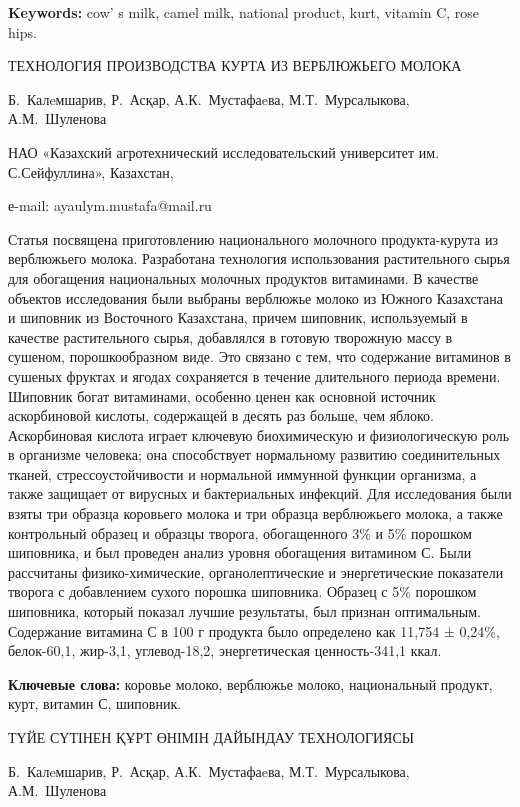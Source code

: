 {\bfseries Keywords:} cow' s milk, camel milk, national
product, kurt, vitamin C, rose hips.

\begin{header}
ТЕХНОЛОГИЯ ПРОИЗВОДСТВА КУРТА ИЗ ВЕРБЛЮЖЬЕГО МОЛОКА

Б.~Калeмшарив,
Р.~Асқар,
А.К.~Мустафаeва\envelope,
М.Т.~Мурсалыкова,
А.М.~Шуленова
\end{header}

\begin{affil}
НАО «Казахский агротехнический исследовательский университет им. С.Сейфуллина», Казахстан,

е-mail: ayaulym.mustafa@mail.ru
\end{affil}

Статья посвящена приготовлению национального молочного продукта-курута
из верблюжьего молока. Разработана технология использования
растительного сырья для обогащения национальных молочных продуктов
витаминами. В качестве объектов исследования были выбраны верблюжье
молоко из Южного Казахстана и шиповник из Восточного Казахстана, причем
шиповник, используемый в качестве растительного сырья, добавлялся в
готовую творожную массу в сушеном, порошкообразном виде. Это связано с
тем, что содержание витаминов в сушеных фруктах и ягодах сохраняется в
течение длительного периода времени. Шиповник богат витаминами, особенно
ценен как основной источник аскорбиновой кислоты, содержащей в десять
раз больше, чем яблоко. Аскорбиновая кислота играет ключевую
биохимическую и физиологическую роль в организме человека; она
способствует нормальному развитию соединительных тканей,
стрессоустойчивости и нормальной иммунной функции организма, а также
защищает от вирусных и бактериальных инфекций. Для исследования были
взяты три образца коровьего молока и три образца верблюжьего молока, а
также контрольный образец и образцы творога, обогащенного 3\% и 5\%
порошком шиповника, и был проведен анализ уровня обогащения витамином С.
Были рассчитаны физико-химические, органолептические и энергетические
показатели творога с добавлением сухого порошка шиповника. Образец с 5\%
порошком шиповника, который показал лучшие результаты, был признан
оптимальным. Содержание витамина С в 100 г продукта было определено как
11,754 ± 0,24\%, белок-60,1, жир-3,1, углевод-18,2, энергетическая
ценность-341,1 ккал.

{\bfseries Ключевые слова:} коровье молоко, верблюжье молоко, национальный
продукт, курт, витамин С, шиповник.

\begin{header}
ТҮЙЕ СҮТІНЕН ҚҰРТ ӨНІМІН ДАЙЫНДАУ ТЕХНОЛОГИЯСЫ

Б.~Калeмшарив,
Р.~Асқар,
А.К.~Мустафаeва\envelope,
М.Т.~Мурсалыкова,
А.М.~Шуленова
\end{header}

